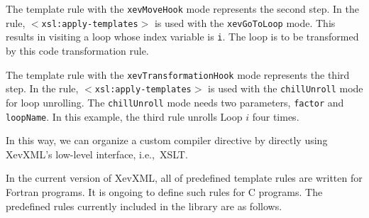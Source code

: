 The template rule with the \texttt{xevMoveHook} mode represents the
second step. In the rule, \texttt{$<$xsl:apply-templates$>$} is used
with the \texttt{xevGoToLoop} mode. This results in visiting a loop
whose index variable is \texttt{i}. The loop is to be transformed by
this code transformation rule.

The template rule with the \texttt{xevTransformationHook} mode
represents the third step. In the rule,
\texttt{$<$xsl:apply-templates$>$} is used with the
\texttt{chillUnroll} mode for loop unrolling. The
\texttt{chillUnroll} mode needs two parameters, \texttt{factor} and
\texttt{loopName}. In this example, the third rule unrolls Loop $i$ four
times.

In this way, we can organize a custom compiler directive by directly
using XevXML's low-level interface, i.e.,~XSLT.

In the current version of XevXML, all of predefined template rules are
written for Fortran programs. It is ongoing to define such rules for C
programs.  The predefined rules currently included in the library are as
follows.

\vspace{36pt}

